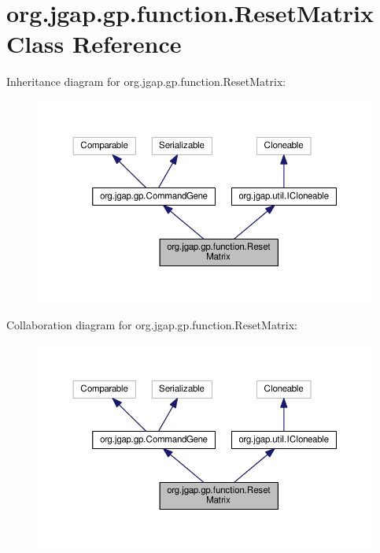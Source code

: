 \hypertarget{classorg_1_1jgap_1_1gp_1_1function_1_1_reset_matrix}{\section{org.\-jgap.\-gp.\-function.\-Reset\-Matrix Class Reference}
\label{classorg_1_1jgap_1_1gp_1_1function_1_1_reset_matrix}
}


Inheritance diagram for org.\-jgap.\-gp.\-function.\-Reset\-Matrix\-:
\nopagebreak
\begin{figure}[H]
\begin{center}
\leavevmode
\includegraphics[width=350pt]{classorg_1_1jgap_1_1gp_1_1function_1_1_reset_matrix__inherit__graph}
\end{center}
\end{figure}


Collaboration diagram for org.\-jgap.\-gp.\-function.\-Reset\-Matrix\-:
\nopagebreak
\begin{figure}[H]
\begin{center}
\leavevmode
\includegraphics[width=350pt]{classorg_1_1jgap_1_1gp_1_1function_1_1_reset_matrix__coll__graph}
\end{center}
\end{figure}

